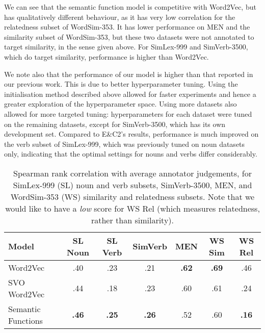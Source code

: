 \documentclass[a4paper,11pt]{article}
\begin{document}
We can see that the semantic function model
is competitive with Word2Vec,
but has qualitatively different behaviour,
as it has very low correlation for the relatedness subset of WordSim-353.
It has lower performance on MEN and the similarity subset of WordSim-353,
but these two datasets were not annotated to target similarity, in the sense given above.
For SimLex-999 and SimVerb-3500, which do target similarity,
performance is higher than Word2Vec.

We note also that the performance of our model is higher than
that reported in our previous work.
This is due to better hyperparameter tuning.
Using the initialisation method described above
allowed for faster experiments and hence a greater exploration of the hyperparameter space.
Using more datasets also allowed for more targeted tuning:
hyperparameters for each dataset were tuned on the remaining datasets,
except for SimVerb-3500, which has its own development set.
Compared to E\&C2's results,
performance is much improved on the verb subset of SimLex-999,
which was previously tuned on noun datasets only,
indicating that the optimal settings for nouns and verbs differ considerably.


\begin{table*}[t]
\centering
\begin{tabularx}{.95\textwidth}{|l|C|C|C|C|C|C|}

\hline
Model & SL Noun & SL Verb & SimVerb & MEN & WS Sim & WS Rel \\ \hline
Word2Vec & .40 & .23 & .21 & \bf .62 & \bf .69 & .46 \\
SVO Word2Vec & .44 & .18 & .23 & .60 & .61 & .24 \\
Semantic Functions & \bf .46 & \bf .25 & \bf .26 & .52 & .60 & \bf .16 \\ \hline

\end{tabularx}
\caption{
Spearman rank correlation with average annotator judgements,
for SimLex-999 (SL) noun and verb subsets,
SimVerb-3500,
MEN, and
WordSim-353 (WS) similarity and relatedness subsets.
Note that we would like to have a \emph{low} score for WS Rel
(which measures relatedness, rather than similarity).
}
\label{tab:lex-sim}
\end{table*}
\end{document}
